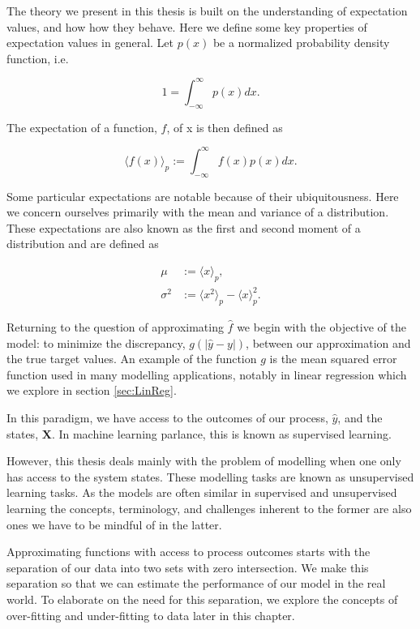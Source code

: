 The theory we present in this thesis is built on the understanding of expectation values, and how how they behave.  Here we define some key properties of expectation values in general. Let $p(x)$ be a normalized probability density function, i.e.

\begin{equation}
1 = \int_{-\infty}^\infty p(x) dx.
\end{equation}

\noindent The expectation of a function, $f$, of x is then defined as 

\begin{equation}\label{eq:expect}
\langle f(x) \rangle_p :=\int_{-\infty}^\infty f(x) p(x) dx.
\end{equation}

\noindent Some particular expectations are notable because of their ubiquitousness. Here we concern ourselves primarily with the mean and variance of a distribution. These expectations are also known as the first and second moment of a distribution and are defined as

\begin{align}
\mu &:= \langle x \rangle_p, \\
\sigma^2 &:= \langle x^2 \rangle_p  - \langle x\rangle_p^2.
\end{align}

\noindent Returning to the question of approximating $\hat{f}$ we begin with the objective of the model: to minimize the discrepancy, $g(|\hat{y} - y|)$, between our approximation and the true target values. An example of the function $g$ is the mean squared error function used in many modelling applications, notably in linear regression which we explore in section \ref{sec:LinReg}.

In this paradigm, we have access to the outcomes of our process, $\hat{y}$, and the states, $\boldsymbol{X}$. In machine learning parlance, this is known as supervised learning. 

However, this thesis deals mainly with the problem of modelling when one only has access to the system states. These modelling tasks are known as unsupervised learning tasks. As the models are often similar in supervised and unsupervised learning the concepts, terminology, and challenges inherent to the former are also ones we have to be mindful of in the latter.

Approximating functions with access to process outcomes starts with the separation of our data into two sets with zero intersection. We make this separation so that we can estimate the performance of our model in the real world. To elaborate on the need for this separation, we explore the concepts of over-fitting and under-fitting to data later in this chapter.